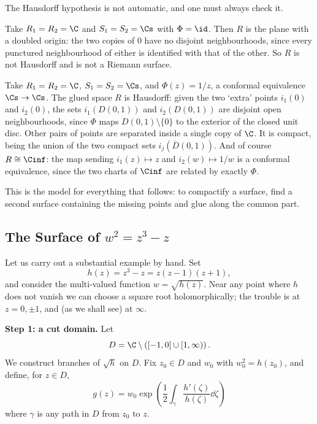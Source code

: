 The Hausdorff hypothesis is not automatic, and one must always check it.

\begin{example}
	Take $R_1 = R_2 = \C$ and $S_1 = S_2 = \Cs$ with $\Phi = \id$. Then $R$ is the plane
	with a doubled origin: the two copies of $0$ have no disjoint neighbourhoods, since
	every punctured neighbourhood of either is identified with that of the other. So $R$ is
	not Hausdorff and is not a Riemann surface.
\end{example}

\begin{example}\label{ex:spheregluing}
	Take $R_1 = R_2 = \C$, $S_1 = S_2 = \Cs$, and $\Phi(z) = 1/z$, a conformal equivalence
	$\Cs \to \Cs$. The glued space $R$ is Hausdorff: given the two `extra' points
	$i_1(0)$ and $i_2(0)$, the sets $i_1(D(0,1))$ and $i_2(D(0,1))$ are disjoint open
	neighbourhoods, since $\Phi$ maps $D(0,1)\setminus\{0\}$ to the exterior of the closed
	unit disc. Other pairs of points are separated inside a single copy of $\C$. It is
	compact, being the union of the two compact sets $i_j(\overline{D}(0,1))$. And of course
	$R \cong \Cinf$: the map sending $i_1(z) \mapsto z$ and $i_2(w) \mapsto 1/w$ is a
	conformal equivalence, since the two charts of $\Cinf$ are related by exactly $\Phi$.
\end{example}

This is the model for everything that follows: to compactify a surface, find a second
surface containing the missing points and glue along the common part.

\subsection{The Surface of $w^2 = z^3 - z$}\label{subsec:cubicsurface}

Let us carry out a substantial example by hand. Set
$$
h(z) = z^3 - z = z(z-1)(z+1),
$$
and consider the multi-valued function $w = \sqrt{h(z)}$. Near any point where $h$ does
not vanish we can choose a square root holomorphically; the trouble is at $z = 0, \pm 1$,
and (as we shall see) at $\infty$.

\vspace{0.4em}
\textbf{Step 1: a cut domain.} Let
$$
D = \C \setminus \left( [-1, 0] \cup [1, \infty) \right).
$$
We construct branches of $\sqrt h$ on $D$. Fix $z_0 \in D$ and $w_0$ with $w_0^2 = h(z_0)$,
and define, for $z \in D$,
$$
g(z) = w_0 \exp\left( \frac{1}{2}\int_\gamma \frac{h'(\zeta)}{h(\zeta)} \dd\zeta \right)
$$
where $\gamma$ is any path in $D$ from $z_0$ to $z$.

